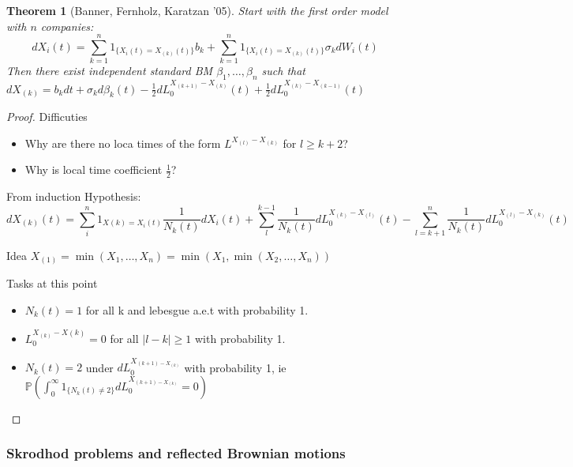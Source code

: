 \documentclass{article} \usepackage[utf8]{inputenc}
\newtheorem{theorem}{Theorem}
\begin{document}
  \begin{theorem}[Banner, Fernholz, Karatzan '05]
    Start with the first order model with $n$ companies:
    $$dX_i(t) = \sum_{k = 1}^n 1_{\{X_i(t) = X_{(k)}(t)\}} b_k + \sum_{k = 1}^n 1_{\{X_i(t) = X_{(k)}(t)\}} \sigma_k dW_i(t)$$
    Then there exist independent standard BM $\beta_1, \ldots, \beta_n$ such that
    $dX_{(k)} = b_k dt + \sigma_k d\beta_k(t) - \frac12 dL_0^{X_{(k+1)} - X_{(k)}}(t) + \frac12 dL_0^{X_{(k)} - X_{(k-1)}}(t)$
  \end{theorem}
  \begin{proof}
    Difficuties
    \begin{itemize}
    \item Why are there no loca times of the form $L^{X_{(l)} - X_{(k)}}$ for $l \ge k+2$?
    \item Why is local time coefficient $\frac12$?
    \end{itemize}

    From induction Hypothesis:
    $$dX_{(k)}(t) = \sum_i^n 1_{X(k) = X_i(t)} \frac{1}{N_k(t)} dX_i(t) + \sum_l^{k-1}\frac{1}{N_k(t)} dL_0^{X_{(k)} - X_{(l)}}(t)
    - \sum_{l=k+1}^n \frac{1}{N_k(t)} dL_0^{X_{(l)} - X_{(k)}}(t)
    $$

    Idea $X_{(1)} = \min(X_1, \ldots, X_n) = \min(X_1, \min(X_2, \ldots, X_n))$

    Tasks at this point
    \begin{itemize}
    \item $N_k(t) =1$ for all k and lebesgue a.e.t with probability 1.
    \item $L_0^{X_{(k)} - X{(k)}} = 0$ for all $|l - k| \ge 1$ with probability 1.
    \item $N_k(t) = 2$ under $dL_0^{X_{(k+1) - X_{(k)}}}$ with probability 1, ie
      $\mathbb P(\int_0^\infty 1_{\{N_k(t) \ne 2 \}} dL_0^{X_{(k+1) - X_{(k)}}} = 0)$
    \end{itemize}
  \end{proof}

  \subsubsection{Skrodhod problems and reflected Brownian motions}
\end{document}
